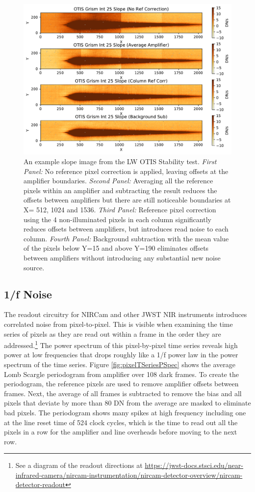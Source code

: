 \documentclass{aastex62}
\begin{document}
\begin{figure}[!hbtp]
\centering
\includegraphics[width=.79\columnwidth]{amplifier_offsets_in_otis_lw_grism.pdf}
\caption{An example slope image from the LW OTIS Stability test.
{\it First Panel:} No reference pixel correction is applied, leaving offsets at the amplifier boundaries.
{\it Second Panel:} Averaging all the reference pixels within an amplifier and subtracting the result reduces the offsets between amplifiers but there are still noticeable boundaries at X= 512, 1024 and 1536.
{\it Third Panel:} Reference pixel correction using the 4 non-illuminated pixels in each column significantly reduces offsets between amplifiers, but introduces read noise to each column.
{\it Fourth Panel:} Background subtraction with the mean value of the pixels below Y=15 and above Y=190 eliminates offsets between amplifiers without introducing any substantial new noise source.
}\label{fig:ampOffsetsOtisGrismSlope}
\end{figure}

\clearpage

\subsection{1/f Noise}
The readout circuitry for NIRCam and other JWST NIR instruments introduces correlated noise from pixel-to-pixel.
This is visible when examining the time series of pixels as they are read out within a frame in the order they are addressed.\footnote{See a diagram of the readout directions at \url{https://jwst-docs.stsci.edu/near-infrared-camera/nircam-instrumentation/nircam-detector-overview/nircam-detector-readout}}
The power spectrum of this pixel-by-pixel time series reveals high power at low frequencies that drops roughly like a 1/f power law in the power spectrum of the time series.
Figure \ref{fig:pixelTSeriesPSpec} shows the average Lomb Scargle periodogram from amplifier over 108 dark frames.
To create the periodogram, the reference pixels are used to remove amplifier offsets between frames.
Next, the average of all frames is subtracted to remove the bias and all pixels that deviate by more than 80 DN from the average are masked to eliminate bad pixels.
The periodogram shows many spikes at high frequency including one at the line reset time of 524 clock cycles, which is the time to read out all the pixels in a row for the amplifier and line overheads before moving to the next row.
\end{document}
